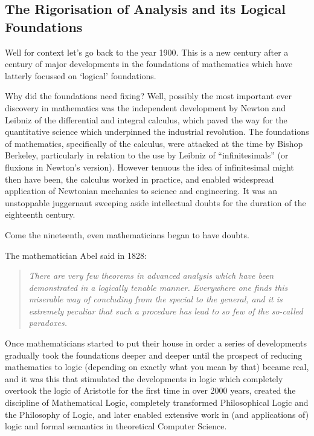 \documentclass[10pt,titlepage]{article}
\begin{document}
\subsection{The Rigorisation of Analysis and its Logical Foundations}

Well for context let's go back to the year 1900.
This is a new century after a century of major developments in the foundations of mathematics which have latterly focussed on `logical' foundations.

Why did the foundations need fixing?
Well, possibly the most important ever discovery in mathematics was the independent development by Newton and Leibniz of the differential and integral calculus, which paved the way for the quantitative science which underpinned the industrial revolution.
The foundations of mathematics, specifically of the calculus, were attacked at the time by Bishop Berkeley, particularly in relation to the use by Leibniz of ``infinitesimals'' (or fluxions in Newton's version).
However tenuous the idea of infinitesimal might then have been, the calculus worked in practice, and enabled widespread application of Newtonian mechanics to science and engineering.
It was an unstoppable juggernaut sweeping aside intellectual doubts for the duration of the eighteenth century.

Come the nineteenth, even mathematicians began to have doubts.

The mathematician Abel said in 1828:
\begin{quote}
  {\it There are very few theorems in advanced analysis which have been demonstrated in a logically tenable manner. Everywhere one finds this miserable way of concluding from the special to the general, and it is extremely peculiar that such a procedure has lead to so few of the so-called paradoxes.}
\end{quote}

Once mathematicians started to put their house in order a series of developments gradually took the foundations deeper and deeper until the prospect of reducing mathematics to logic (depending on exactly what you mean by that) became real, and it was this that stimulated the developments in logic which completely overtook the logic of Aristotle for the first time in over 2000 years, created the discipline of Mathematical Logic, completely transformed Philosophical Logic and the Philosophy of Logic, and later enabled extensive work in (and applications of) logic and formal semantics in theoretical Computer Science.
\end{document}
